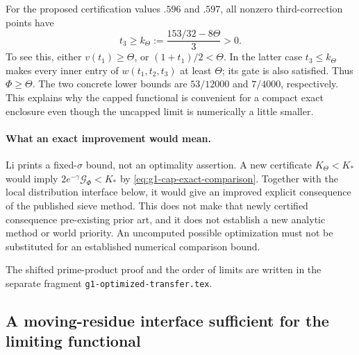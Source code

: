 \documentclass[11pt]{article}
\begin{document}
For the proposed certification values $.596$ and $.597$, all
nonzero third-correction points have
\[
 t_3\ge k_\Theta:=\frac{153/32-8\Theta}{3}>0.
\]
To see this, either $v(t_1)\ge\Theta$, or
$(1+t_1)/2<\Theta$. In the latter case $t_3\le k_\Theta$
makes every inner entry of $w(t_1,t_2,t_3)$ at least $\Theta$;
its gate is also satisfied. Thus $\Phi\ge\Theta$.
The two concrete lower bounds are $53/12000$ and $7/4000$,
respectively. This explains why the capped functional is convenient
for a compact exact enclosure even though the uncapped limit is
numerically a little smaller.

\paragraph{What an exact improvement would mean.}
Li prints a fixed-$\sigma$ bound, not an optimality assertion.
A new certificate $K_\Theta<K_*$ would imply
$2e^{-\gamma}\mathcal G_\Phi<K_*$ by
\eqref{eq:g1-cap-exact-comparison}. Together with the local
distribution interface below, it would give an improved explicit
consequence of the published sieve method. This does not make
that newly certified consequence pre-existing prior art, and it
does not establish a new analytic method or world priority.
An uncomputed possible optimization must not be substituted for
an established numerical comparison bound.

The shifted prime-product proof and the order of limits are written
in the separate fragment \texttt{g1-optimized-transfer.tex}.


\subsection{A moving-residue interface sufficient for the limiting functional}
\label{sec:g1-localized-interface}
\end{document}
